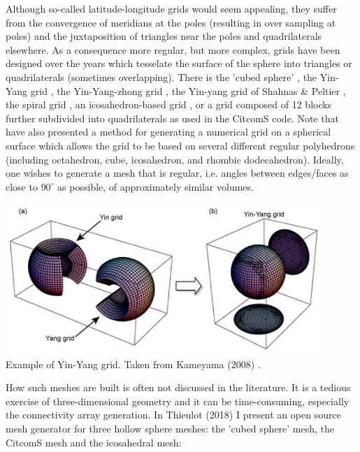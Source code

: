 Although so-called latitude-longitude grids would seem appealing, 
they suffer from the convergence of meridians at the poles
(resulting in over sampling at poles) and the juxtaposition of triangles 
near the poles and quadrilaterals elsewhere. 
As a consequence more regular, but more complex, grids have been designed 
over the years which tesselate the surface of the 
sphere into triangles or quadrilaterals (sometimes overlapping).
There is the 'cubed sphere' \cite{roip96,heta03,chob05,sthh06,chcc07,brmw10,yiym19},
the Yin-Yang grid \cite{kasa04,yoka04,yoka06,kaks08,tack08,crta14,crta16},
the Yin-Yang-zhong grid \cite{haka16}, the Yin-yang grid of 
Shahnas \& Peltier \cite{shpe15}, the spiral grid \cite{hust08}, 
an icosahedron-based grid \cite{bafr85,tasu01},
or a grid composed of 12 blocks further subdivided into quadrilaterals \cite{zhzm00} 
as used in the CitcomS code.
Note that \cite{oldp12} have also presented a method for generating a numerical 
grid on a spherical surface which 
allows the grid to be based on several different regular polyhedrons (including octahedron, 
cube, icosahedron, and rhombic dodecahedron). 
Ideally, one wishes to generate a mesh that is regular,
i.e. angles between edges/faces as close to $90^\circ$ as possible, 
of approximately similar volumes.


\begin{center}
\includegraphics[width=12cm]{images/meshes/kaks08}\\
{\captionfont Example of Yin-Yang grid. Taken from Kameyama \etal (2008) \cite{kaks08}.}
\end{center}

How such meshes are built is often not discussed in the literature. It is 
a tedious exercise of three-dimensional geometry and it can be time-consuming, especially 
the connectivity array generation. In Thieulot (2018) \cite{thie18} I present an open source 
mesh generator for three hollow sphere meshes: the 'cubed sphere' mesh, the CitcomS mesh and the 
icosahedral mesh:

